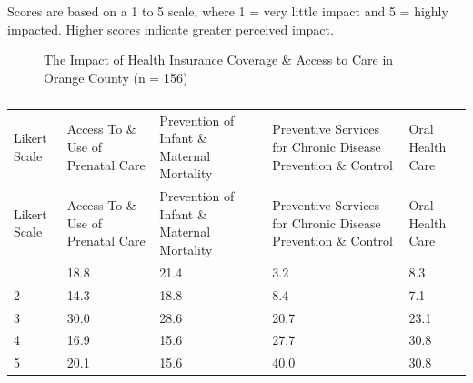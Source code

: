 \documentclass[
  english,
  letterpaper,
]{report}
\begin{document}
\begin{tcolorbox}[enhanced jigsaw, breakable, leftrule=.75mm, title=\textcolor{quarto-callout-note-color}{\faInfo}\hspace{0.5em}{Note}, bottomrule=.15mm, opacityback=0, left=2mm, colback=white, bottomtitle=1mm, coltitle=black, colbacktitle=quarto-callout-note-color!10!white, colframe=quarto-callout-note-color-frame, opacitybacktitle=0.6, toptitle=1mm, titlerule=0mm, arc=.35mm, rightrule=.15mm, toprule=.15mm]

Scores are based on a 1 to 5 scale, where 1 = very little impact and 5 =
highly impacted. Higher scores indicate greater perceived impact.

\end{tcolorbox}

\begin{figure}


\caption{\label{fig-oc-impact-hlthinsur-access}The Impact of Health
Insurance Coverage \& Access to Care in Orange County (n = 156)}

\end{figure}%

\begin{longtable}[]{@{}lllll@{}}

\caption{\label{tbl-oc-impact-hlthinsur-access}The Impact of Health
Insurance Coverage \& Access to Care in Orange County (n = 156)}

\tabularnewline

\caption{}\label{T_adf49}\tabularnewline
\toprule\noalign{}
Likert Scale & Access To \& Use of Prenatal Care & Prevention of Infant
\& Maternal Mortality & Preventive Services for Chronic Disease
Prevention \& Control & Oral Health Care \\
\midrule\noalign{}
\endfirsthead
\toprule\noalign{}
Likert Scale & Access To \& Use of Prenatal Care & Prevention of Infant
\& Maternal Mortality & Preventive Services for Chronic Disease
Prevention \& Control & Oral Health Care \\
\midrule\noalign{}
\endhead
\bottomrule\noalign{}
\endlastfoot
1 & 18.8 & 21.4 & 3.2 & 8.3 \\
2 & 14.3 & 18.8 & 8.4 & 7.1 \\
3 & 30.0 & 28.6 & 20.7 & 23.1 \\
4 & 16.9 & 15.6 & 27.7 & 30.8 \\
5 & 20.1 & 15.6 & 40.0 & 30.8 \\

\end{longtable}
\end{document}
